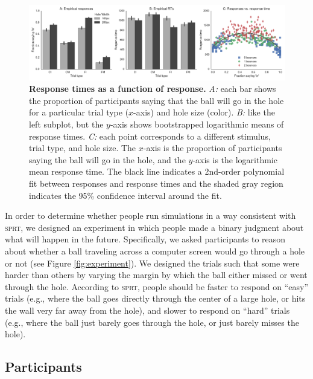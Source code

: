 \documentclass[10pt,letterpaper]{article}
\begin{document}
\begin{figure}[t]
    \begin{center}
        \includegraphics[width=\textwidth]{figures/hole_empirical_results.pdf}
        \caption{\textbf{Response times as a function of response.} \emph{A:} each bar shows the proportion of participants saying that the ball will go in the hole for a particular trial type ($x$-axis) and hole size (color). \emph{B:} like the left subplot, but the $y$-axis shows bootstrapped logarithmic means of response times. \emph{C:} each point corresponds to a different stimulus, trial type, and hole size.  The $x$-axis is the proportion of participants saying the ball will go in the hole, and the $y$-axis is the logarithmic mean response time. The black line indicates a 2nd-order polynomial fit between responses and response times and the shaded gray region indicates the 95\% confidence interval around the fit.}
        \label{fig:pct-vs-rt}
    \end{center}
\end{figure}

In order to determine whether people run simulations in a way consistent with \textsc{sprt}, we designed an experiment in which people made a binary judgment about what will happen in the future.
Specifically, we asked participants to reason about whether a ball traveling across a computer screen would go through a hole or not (see Figure \ref{fig:experiment}).
We designed the trials such that some were harder than others by varying the margin by which the ball either missed or went through the hole.
According to \textsc{sprt}, people should be faster to respond on ``easy'' trials (e.g., where the ball goes directly through the center of a large hole, or hits the wall very far away from the hole), and slower to respond on ``hard'' trials (e.g., where the ball just barely goes through the hole, or just barely misses the hole).

\subsection{Participants}
\end{document}
